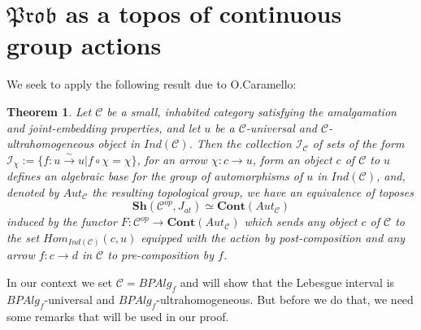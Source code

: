 \documentclass[a4paper]{amsproc}
\theoremstyle{plain}
\newtheorem{theorem}{Theorem}[section]
\theoremstyle{definition}
\theoremstyle{remark}
\numberwithin{equation}{section}
\begin{document}
\section{$\mathfrak{Prob}$ as a topos of continuous group actions}

We seek to apply the following result due to O.Caramello:

\begin{theorem}\label{olivia}
Let $\mathcal{C}$ be a small, inhabited category satisfying the amalgamation and joint-embedding properties, and let $u$ be a $\mathcal{C}$-universal and $\mathcal{C}$-ultrahomogeneous object in $Ind(\mathcal{C})$. Then the collection $\mathcal{I}_{\mathcal{C}}$ of sets of the form $\mathcal{I}_{\chi}:=\{f:u\overset{\sim}{\rightarrow} u| f\circ \chi=\chi\} $, for an arrow $\chi:c\rightarrow u$, form an object $c$ of $\mathcal{C}$ to $u$ defines an algebraic base for the group of automorphisms of $u$ in $Ind(\mathcal{C})$, and, denoted by $Aut_\mathcal{C}$ the resulting topological group, we have an equivalence of toposes
\[\textbf{Sh}(\mathcal{C}^{op},J_{at})\simeq \textbf{Cont}(Aut_\mathcal{C}) \]
induced by the functor $F:\mathcal{C}^{op}\rightarrow \textbf{Cont}(Aut_{\mathcal{C}})$ which sends any object $c$ of $\mathcal{C}$ to the set $Hom_{Ind(\mathcal{C})}(c,u)$ equipped with the action by post-composition and any arrow $f:c\rightarrow d$ in $\mathcal{C}$ to pre-composition by $f$.
\end{theorem}

In our context we set $\mathcal{C}=BPAlg_f$ and will show that the Lebesgue interval is $BPAlg_f$-universal and $BPAlg_f$-ultrahomogeneous. But before we do that, we need some remarks that will be used in our proof.
\end{document}
